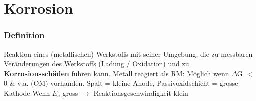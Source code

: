\section{Korrosion}
\subsubsection{Definition}
Reaktion eines (metallischen) Werkstoffs mit seiner Umgebung, die zu messbaren Veränderungen des Werkstoffs (Ladung / Oxidation) und zu \textbf{Korrosionsschäden} führen kann. \newline
Metall reagiert als RM: 
Möglich wenn $\Delta$G $<$ 0 $\&$ v.a.  (OM) vorhanden. \newline
Spalt = kleine Anode, Passivoxidschicht = grosse Kathode \newline
Wenn $E_a$ gross $\to$ Reaktionsgeschwindigkeit klein


